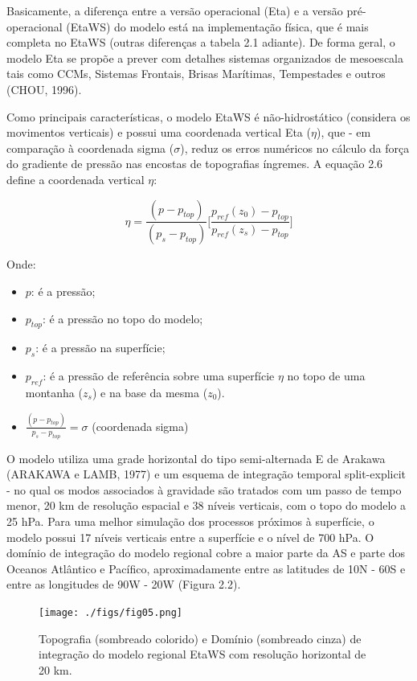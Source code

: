 Basicamente, a diferença entre a versão operacional (Eta) e a versão pré-operacional (EtaWS) do modelo está na implementação física, que é mais completa no EtaWS (outras diferenças a tabela 2.1 adiante). De forma geral, o modelo Eta se propõe a prever com detalhes sistemas organizados de mesoescala tais como CCMs, Sistemas Frontais, Brisas Marítimas, Tempestades e outros (CHOU, 1996).

Como principais características, o modelo EtaWS é não-hidrostático (considera os movimentos verticais) e possui uma coordenada vertical Eta ($\eta$), que - em comparação à coordenada sigma ($\sigma$), reduz os erros numéricos no cálculo da força do gradiente de pressão nas encostas de topografias íngremes. A equação 2.6 define a coordenada vertical $\eta$:

\begin{equation}
\eta=\frac{(p-p_{top})}{(p_{s}-p_{top})}\bigg[\frac{p_{ref}(z_{0})-p_{top}}{p_{ref}(z_{s})-p_{top}}\bigg]
\label{form09}
\end{equation}

Onde:

\begin{itemize}
\item $p$: é a pressão;
\item $p_{top}$: é a pressão no topo do modelo;
\item $p_{s}$: é a pressão na superfície;
\item $p_{ref}$: é a pressão de referência sobre uma superfície $\eta$ no topo de uma montanha ($z_{s}$) e na base da mesma ($z_{0}$).
\item $\frac{(p-p_{top})}{p_{s}-p_{top}}=\sigma$ (coordenada sigma)
\end{itemize}

O modelo utiliza uma grade horizontal do tipo semi-alternada E de Arakawa (ARAKAWA e LAMB, 1977) e um esquema de integração temporal split-explicit - no qual os modos associados à gravidade são tratados com um passo de tempo menor, 20 km de resolução espacial e 38 níveis verticais, com o topo do modelo a 25 hPa. Para uma melhor simulação dos processos próximos à superfície, o modelo possui 17 níveis verticais entre a superfície e o nível de 700 hPa. O domínio de integração do modelo regional cobre a maior parte da AS e parte dos Oceanos Atlântico e Pacífico, aproximadamente entre as latitudes de 10N - 60S e entre as longitudes de 90W - 20W (Figura 2.2). 

\begin{figure}
\centering
\texttt{[image: ./figs/fig05.png]}
\caption{Topografia (sombreado colorido) e Domínio (sombreado cinza) de integração do modelo regional EtaWS com resolução horizontal de 20 km.}
\label{fig05}
\end{figure}

